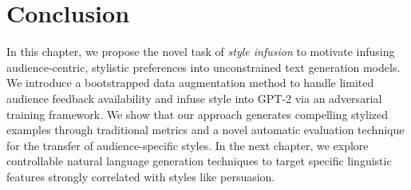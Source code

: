 \section{Conclusion}
\label{sec:si_conclusion}

In this chapter, we propose the novel task of \textit{style infusion} to motivate infusing audience-centric, stylistic preferences into unconstrained text generation models. We introduce a bootstrapped data augmentation method to handle limited audience feedback availability and infuse style into GPT-2 via an adversarial training framework. We show that our approach generates compelling stylized examples through traditional metrics and a novel automatic evaluation technique for the transfer of audience-specific styles. In the next chapter, we explore controllable natural language generation techniques to target specific linguistic features strongly correlated with styles like persuasion.